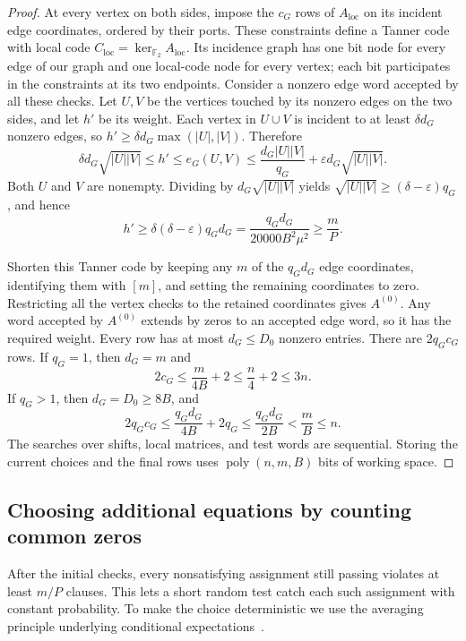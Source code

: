 \documentclass[11pt,reqno]{amsart}
\numberwithin{equation}{section}
\theoremstyle{definition}\newtheorem{definition}[theorem]{Definition}
\theoremstyle{remark}\newtheorem{remark}[theorem]{Remark}
\newcommand{\poly}{\operatorname{poly}}
\renewcommand{\le}{\leqslant}
\renewcommand{\ge}{\geqslant}
\begin{document}
\begin{proof}
At every vertex on both sides, impose the $c_G$ rows of
$A_{\mathrm{loc}}$ on its incident edge coordinates, ordered by
their ports. These constraints define a Tanner code with local
code $C_{\mathrm{loc}}=\ker_{\mathbb F_2}A_{\mathrm{loc}}$.
Its incidence graph has one bit node for every edge of our graph
and one local-code node for every vertex; each bit participates
in the constraints at its two endpoints.
Consider a nonzero edge word accepted by all these
checks. Let $U,V$ be the vertices touched by its nonzero edges on
the two sides, and let $h'$ be its weight. Each vertex in $U\cup V$
is incident to at least $\delta d_G$ nonzero edges, so
$h'\ge\delta d_G\max(|U|,|V|)$. Therefore
\[
 \delta d_G\sqrt{|U||V|}
 \le h'\le e_G(U,V)
 \le\frac{d_G|U||V|}{q_G}
       +\varepsilon d_G\sqrt{|U||V|}.
\]
Both $U$ and $V$ are nonempty. Dividing by
$d_G\sqrt{|U||V|}$ yields
$\sqrt{|U||V|}\ge(\delta-\varepsilon)q_G$, and hence
\[
 h'\ge\delta(\delta-\varepsilon)q_Gd_G
 =\frac{q_Gd_G}{20000B^2\mu^2}\ge\frac mP.
\]

Shorten this Tanner code by keeping any $m$ of the $q_Gd_G$ edge
coordinates, identifying them with $[m]$, and setting the remaining
coordinates to zero. Restricting all
the vertex checks to the retained coordinates gives $A^{(0)}$.
Any word accepted by $A^{(0)}$ extends by zeros to an accepted edge
word, so it has the required weight. Every row has at most
$d_G\le D_0$ nonzero entries. There are $2q_Gc_G$ rows. If $q_G=1$,
then $d_G=m$ and
\[
 2c_G\le\frac{m}{4B}+2\le\frac n4+2\le3n.
\]
If $q_G>1$, then $d_G=D_0\ge8B$, and
\[
 2q_Gc_G\le\frac{q_Gd_G}{4B}+2q_G
 \le\frac{q_Gd_G}{2B}<\frac mB\le n.
\]
The searches over shifts, local matrices, and test words are
sequential. Storing the current choices and the final rows uses
$\poly(n,m,B)$ bits of working space.
\end{proof}

\subsection{Choosing additional equations by counting common zeros}
After the initial checks, every nonsatisfying assignment still passing
violates at least $m/P$ clauses. This lets a short random test catch
each such assignment with constant probability. To make the choice
deterministic we use the averaging principle underlying conditional
expectations~\cite{Raghavan88}.
\end{document}
